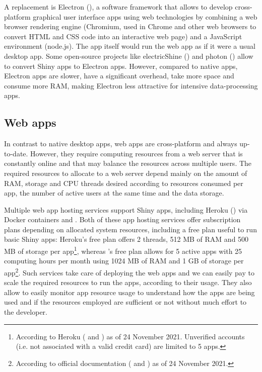 A replacement is Electron (), a software framework that allows to develop cross-platform graphical user interface apps using web technologies by combining a web browser rendering engine (Chromium, used in Chrome and other web browsers to convert HTML and CSS code into an interactive web page) and a JavaScript environment (node.js). The app itself would run the web app as if it were a usual desktop app. Some open-source projects like electricShine () and photon () allow to convert Shiny apps to Electron apps. However, compared to native apps, Electron apps are slower, have a significant overhead, take more space and consume more RAM, making Electron less attractive for intensive data-processing apps.

\subsection{Web apps}

In contrast to native desktop apps, web apps are cross-platform and always up-to-date. However, they require computing resources from a web server that is constantly online and that may balance the resources across multiple users. The required resources to allocate to a web server depend mainly on the amount of RAM, storage and CPU threads desired according to resources consumed per app, the number of active users at the same time and the data storage.

Multiple web app hosting services support Shiny apps, including Heroku () via Docker containers and . Both of these app hosting services offer subscription plans depending on allocated system resources, including a free plan useful to run basic Shiny apps: Heroku's free plan offers 2 threads, 512 MB of RAM and 500 MB of storage per app\footnote{According to Heroku ( and ) as of 24 November 2021. Unverified accounts (i.e. not associated with a valid credit card) are limited to 5 apps.}, whereas 's free plan allows for 5 active apps with 25 computing hours per month using 1024 MB of RAM and 1 GB of storage per app\footnote{According to official  documentation ( and ) as of 24 November 2021.}. Such services take care of deploying the web apps and we can easily pay to scale the required resources to run the apps, according to their usage. They also allow to easily monitor app resource usage to understand how the apps are being used and if the resources employed are sufficient or not without much effort to the developer.

